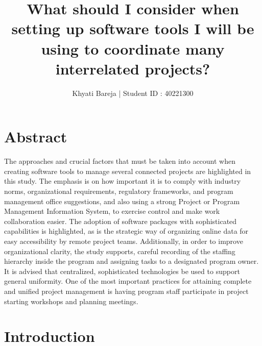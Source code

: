 \documentclass[runningheads]{llncs}
\begin{document}
%
\title{What should I consider when setting
up software tools I will be using to
coordinate many interrelated projects?}
%
%
\author{Khyati Bareja | Student ID : 40221300}
%

%

%
%
\maketitle

\tableofcontents

\newpage

\section{Abstract}
The approaches and crucial factors that must be taken into account when creating software tools to manage several connected projects are highlighted in this study. The emphasis is on how important it is to comply with industry norms, organizational requirements, regulatory frameworks, and program management office suggestions, and also using a strong Project or Program Management Information System, to exercise control and make work collaboration easier. The adoption of software packages with sophisticated capabilities is highlighted, as is the strategic way of organizing online data for easy accessibility by remote project teams. Additionally, in order to improve organizational clarity, the study supports, careful recording of the staffing hierarchy inside the program and assigning tasks to a designated program owner. It is advised that centralized, sophisticated technologies be used to support general uniformity. One of the most important practices for attaining complete and unified project management is having program staff participate in project starting workshops and planning meetings.

\section{Introduction}
\end{document}
